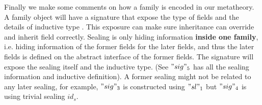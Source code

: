 Finally we make some comments on how a family is encoded in our
metatheory. A family object will have a signature that expose the type
of fields and the details of inductive type . This exposure can make
sure inheritance can override and inherit field correctly. Sealing is
only hiding information \textbf{inside one family}, i.e. hiding
information of the former fields for the later fields, and thus the
later fields is defined on the abstract interface of the former fields.
The signature will expose the sealing itself and the inductive type.
(See $"sig"_5$ has all the sealing information and inductive
definition). A former sealing might not be related to any later sealing,
for example, $"sig"_3$ is constructed using $"sl"_1$ but $"sig"_4$ is
using trivial sealing $id_s$.